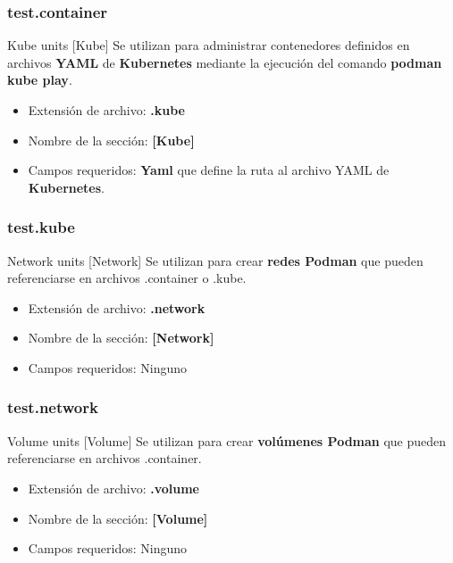 \begin{frame}[fragile]
  \frametitle{test.container}
  
\end{frame}

\begin{frame}[c]{Kube units [Kube]}
  Se utilizan para administrar contenedores definidos en archivos
  \textbf{YAML} de \textbf{Kubernetes} mediante la ejecución del
  comando \textbf{podman kube play}.
  \begin{itemize}
    \item Extensión de archivo: \textbf{.kube}
    \item Nombre de la sección: \textbf{[Kube]}
    \item Campos requeridos: \textbf{Yaml} que define la ruta al
      archivo YAML de \textbf{Kubernetes}.
  \end{itemize}
\end{frame}

\begin{frame}[fragile]
  \frametitle{test.kube}
  
\end{frame}

\begin{frame}[c]{Network units [Network]}
  Se utilizan para crear \textbf{redes Podman} que pueden referenciarse en
  archivos .container o .kube.
  \begin{itemize}
    \item Extensión de archivo: \textbf{.network}
    \item Nombre de la sección: \textbf{[Network]}
    \item Campos requeridos: Ninguno
  \end{itemize}
\end{frame}

\begin{frame}[fragile]
  \frametitle{test.network}
  
\end{frame}

\begin{frame}[c]{Volume units [Volume]}
  Se utilizan para crear \textbf{volúmenes Podman} que pueden
  referenciarse en archivos .container.
  \begin{itemize}
    \item Extensión de archivo: \textbf{.volume}
    \item Nombre de la sección: \textbf{[Volume]}
    \item Campos requeridos: Ninguno
  \end{itemize}
\end{frame}

